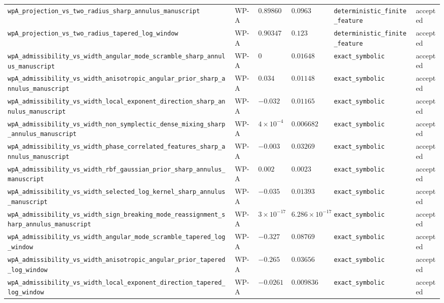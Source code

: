 \begin{table}[t]
\begin{tabular}{@{}llllll@{}}
\texttt{wpA\_projection\_vs\_two\_radius\_sharp\_annulus\_manuscript} & WP-A & $0.898608$ & $0.0963$ & \texttt{deterministic\_finite\_feature} & accepted \\
\texttt{wpA\_projection\_vs\_two\_radius\_tapered\_log\_window} & WP-A & $0.903473$ & $0.123$ & \texttt{deterministic\_finite\_feature} & accepted \\
\texttt{wpA\_admissibility\_vs\_width\_angular\_mode\_scramble\_sharp\_annulus\_manuscript} & WP-A & $0$ & $0.01648$ & \texttt{exact\_symbolic} & accepted \\
\texttt{wpA\_admissibility\_vs\_width\_anisotropic\_angular\_prior\_sharp\_annulus\_manuscript} & WP-A & $0.034$ & $0.01148$ & \texttt{exact\_symbolic} & accepted \\
\texttt{wpA\_admissibility\_vs\_width\_local\_exponent\_direction\_sharp\_annulus\_manuscript} & WP-A & $-0.032$ & $0.01165$ & \texttt{exact\_symbolic} & accepted \\
\texttt{wpA\_admissibility\_vs\_width\_non\_symplectic\_dense\_mixing\_sharp\_annulus\_manuscript} & WP-A & $4\times10^{-4}$ & $0.006682$ & \texttt{exact\_symbolic} & accepted \\
\texttt{wpA\_admissibility\_vs\_width\_phase\_correlated\_features\_sharp\_annulus\_manuscript} & WP-A & $-0.003$ & $0.03269$ & \texttt{exact\_symbolic} & accepted \\
\texttt{wpA\_admissibility\_vs\_width\_rbf\_gaussian\_prior\_sharp\_annulus\_manuscript} & WP-A & $0.002$ & $0.0023$ & \texttt{exact\_symbolic} & accepted \\
\texttt{wpA\_admissibility\_vs\_width\_selected\_log\_kernel\_sharp\_annulus\_manuscript} & WP-A & $-0.035$ & $0.01393$ & \texttt{exact\_symbolic} & accepted \\
\texttt{wpA\_admissibility\_vs\_width\_sign\_breaking\_mode\_reassignment\_sharp\_annulus\_manuscript} & WP-A & $3\times10^{-17}$ & $6.286\times10^{-17}$ & \texttt{exact\_symbolic} & accepted \\
\texttt{wpA\_admissibility\_vs\_width\_angular\_mode\_scramble\_tapered\_log\_window} & WP-A & $-0.327$ & $0.08769$ & \texttt{exact\_symbolic} & accepted \\
\texttt{wpA\_admissibility\_vs\_width\_anisotropic\_angular\_prior\_tapered\_log\_window} & WP-A & $-0.265$ & $0.03656$ & \texttt{exact\_symbolic} & accepted \\
\texttt{wpA\_admissibility\_vs\_width\_local\_exponent\_direction\_tapered\_log\_window} & WP-A & $-0.0261$ & $0.009836$ & \texttt{exact\_symbolic} & accepted \\

\end{tabular}
\end{table}
